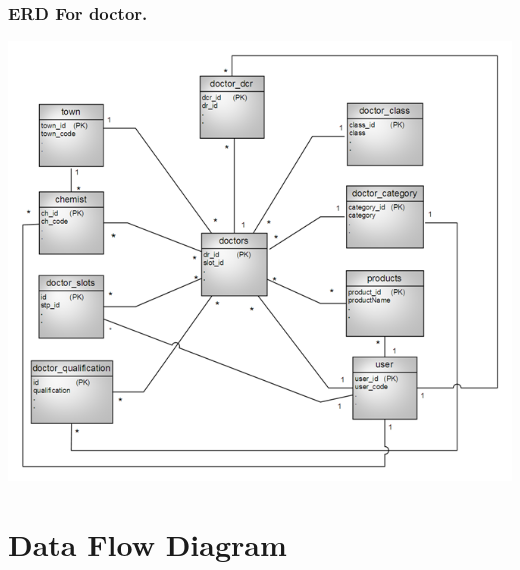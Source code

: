 \subsubsection{ERD For doctor.}
\includegraphics[scale=0.7]{Diag/ERDdoctor.png}
\label{abc}


%

\section{Data Flow Diagram}


